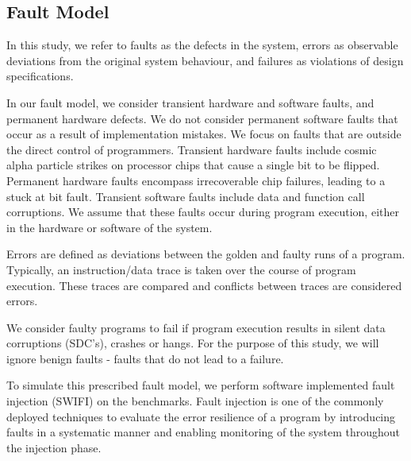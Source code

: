 \subsection{Fault Model}
\label{sec:fault_model}

In this study, we refer to faults as the defects in the system, errors as observable deviations from the original system behaviour, and failures as violations of design specifications.

In our fault model, we consider transient hardware and software faults, and permanent hardware defects.
We do not consider permanent software faults that occur as a result of implementation mistakes.
We focus on faults that are outside the direct control of programmers.
Transient hardware faults include cosmic alpha particle strikes on processor chips that cause a single bit to be flipped.
Permanent hardware faults encompass irrecoverable chip failures, leading to a stuck at bit fault.
Transient software faults include data and function call corruptions. 
We assume that these faults occur during program execution, either in the hardware or software of the system. 

Errors are defined as deviations between the golden and faulty runs of a program.
Typically, an instruction/data trace is taken over the course of program execution. 
These traces are compared and conflicts between traces are considered errors.

We consider faulty programs to fail if program execution results in silent data corruptions (SDC's), crashes or hangs. For the purpose of this study, we will ignore benign faults - faults that do not lead to a failure.

To simulate this prescribed fault model, we perform software implemented fault injection (SWIFI) on the benchmarks.  
Fault injection is one of the commonly deployed techniques to evaluate the error resilience of a program by introducing faults in a systematic manner and enabling monitoring of the system throughout the injection phase.
